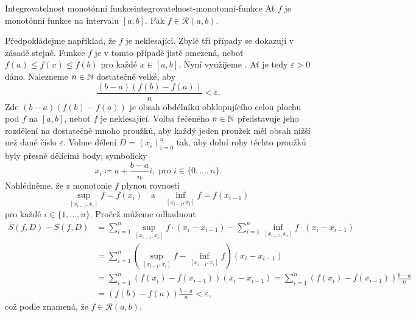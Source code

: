 \begin{proposition}{Integrovatelnost monotónní funkce}{integrovatelnost-monotonni-funkce}
 Ať $f$ je monotónní funkce na intervalu $[a,b]$. Pak $f \in \mathcal{R}(a,b)$.
\end{proposition}
\begin{propproof}
 Předpokládejme například, že $f$ je neklesající. Zbylé tři případy se dokazují
 v zásadě stejně. Funkce $f$ je v tomto případě jistě omezená, neboť $f(a) \leq
 f(x) \leq f(b)$ pro každé $x \in [a,b]$. Nyní využijeme
 . Ať je tedy $\varepsilon>0$
 dáno. Nalezneme $n \in \mathbb{N}$ dostatečně velké, aby
 \[
  \frac{(b-a)(f(b) - f(a))}{n} < \varepsilon.
 \]
 Zde $(b-a)(f(b) - f(a))$ je obsah obdélníku obklopujícího celou plochu pod $f$
 na $[a,b]$, neboť $f$ je neklesající. Volba řečeného $n \in \mathbb{N}$ představuje
 jeho rozdělení na dostatečně mnoho proužků, aby každý jeden proužek měl obsah
 nižší než dané číslo $\varepsilon$. Volme dělení $D = (x_i)_{i=0}^{n}$ tak, aby
 dolní rohy těchto proužků byly přesně dělícími body; symbolicky
 \[
  x_i \coloneqq a + \frac{b-a}{n}i, \; \text{pro } i \in \{0,\ldots,n\}.
 \]
 Nahlédněme, že z monotonie $f$ plynou rovnosti
 \[
  \sup_{[x_{i-1},x_i]} f = f(x_i) \quad \text{a} \quad \inf_{[x_{i-1},x_i]} f =
  f(x_{i-1})
 \]
 pro každé $i \in \{1,\ldots,n\}$. Pročež můžeme odhadnout
 \begin{align*}
  \overline{S}(f,D) - \underline{S}(f,D) &= \sum_{i = 1}^{n}
  \sup_{[x_{i-1},x_i]}f \cdot (x_i - x_{i-1}) - \sum_{i = 1}^{n}
  \inf_{[x_{i-1},x_i]}f \cdot (x_i - x_{i-1})\\
                                         &= \sum_{i = 1}^{n}
                                         (\sup_{[x_{i-1},x_i]} f-
                                         \inf_{[x_{i-1},x_i]}f)(x_i - x_{i-1})\\
                                         &= \sum_{i = 1}^{n} (f(x_i) -
                                         f(x_{i-1}))(x_i - x_{i-1}) = \sum_{i =
                                         1}^{n} (f(x_i) - f(x_{i-1}))
                                         \frac{b-a}{n}\\
                                         &= (f(b) - f(a))
                                         \frac{b-a}{n}<\varepsilon,
 \end{align*}
 což podle  znamená, že
 $f \in \mathcal{R}(a,b)$.
\end{propproof}

